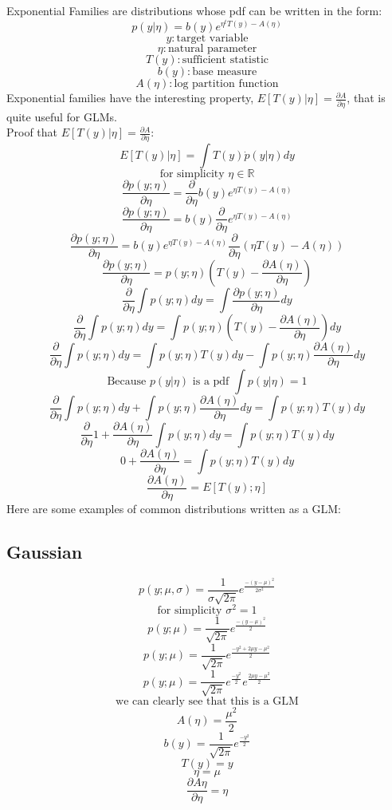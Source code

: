 \documentclass{article}
\newcommand{\R}{\mathbb{R}}
\newcommand{\pard}[2]{\frac{\partial {#1}}{\partial {#2}}}
\begin{document}
Exponential Families are distributions whose pdf can be written in the form:
    $$p(y|\eta) = b(y) e^{\eta^tT(y) - A(\eta)}$$
    $$y :\text{target variable}$$
    $$\eta :\text{natural parameter}$$
    $$T(y) :\text{sufficient statistic}$$
    $$b(y) : \text{base measure}$$
    $$A(\eta) :\text{log partition function}$$
Exponential families have the interesting property, $E[T(y)|\eta] = \frac{\partial A}{\partial \eta}$, that is quite useful for GLMs. \\
Proof that $E[T(y)|\eta] = \frac{\partial A}{\partial \eta}$:
    $$E[T(y)|\eta] = \int{T(y) \dot p(y | \eta) dy}$$
    $$\text{for simplicity } \eta \in \R$$
    $$\pard{p(y;\eta)}{\eta} = \pard{}{\eta} b(y)e^{\eta T(y) - A(\eta)}$$
    $$\pard{p(y;\eta)}{\eta} =  b(y) \pard{}{\eta} e^{\eta T(y) - A(\eta)}$$
    $$\pard{p(y;\eta)}{\eta} =  b(y)  e^{\eta T(y) - A(\eta)} \pard{}{\eta} (\eta T(y) - A(\eta)) $$
    $$\pard{p(y;\eta)}{\eta} = p(y;\eta) (T(y) - \pard{A(\eta)}{\eta}) $$
    $$\pard{}{\eta} \int p(y;\eta) dy = \int \pard{p(y;\eta)}{\eta} dy$$
    $$\pard{}{\eta} \int p(y;\eta) dy = \int p(y;\eta) (T(y) - \pard{A(\eta)}{\eta}) dy$$
    $$\pard{}{\eta} \int p(y;\eta) dy = \int p(y;\eta)T(y) dy - \int p(y;\eta)\pard{A(\eta)}{\eta} dy$$
    $$\text{Because }p(y|\eta)\text{ is a pdf } \int p(y|\eta) = 1$$
    $$\pard{}{\eta} \int p(y;\eta) dy + \int p(y;\eta)\pard{A(\eta)}{\eta} dy = \int p(y;\eta)T(y) dy$$
    $$\pard{}{\eta} 1 + \pard{A(\eta)}{\eta} \int p(y;\eta) dy = \int p(y;\eta)T(y) dy$$
    $$0 + \pard{A(\eta)}{\eta} = \int p(y;\eta)T(y) dy$$
    $$\pard{A(\eta)}{\eta} = E[T(y);\eta]$$
Here are some examples of common distributions written as a GLM:
\subsection{Gaussian}
    $$p(y;\mu,\sigma) = \frac{1}{\sigma \sqrt{2\pi}}e^{\frac{-(y-\mu)^2}{2\sigma^2}}$$
    $$\text{for simplicity } \sigma^2 = 1$$
    $$p(y;\mu) = \frac{1}{\sqrt{2\pi}}e^{\frac{-(y-\mu)^2}{2}}$$
    $$p(y;\mu) = \frac{1}{\sqrt{2\pi}}e^{\frac{-y^2 + 2\mu y - \mu^2}{2}}$$
    $$p(y;\mu) = \frac{1}{\sqrt{2\pi}}e^{\frac{-y^2}{2}}e^{\frac{2\mu y - \mu^2}{2}}$$
    $$\text{we can clearly see that this is a GLM}$$
    $$A(\eta) = \frac{\mu^2}{2}$$
    $$b(y) = \frac{1}{\sqrt{2\pi}}e^{\frac{-y^2}{2}} $$
    $$T(y) = y$$
    $$\eta= \mu$$
    $$\pard{A{\eta}}{\eta} = \eta$$
\end{document}

